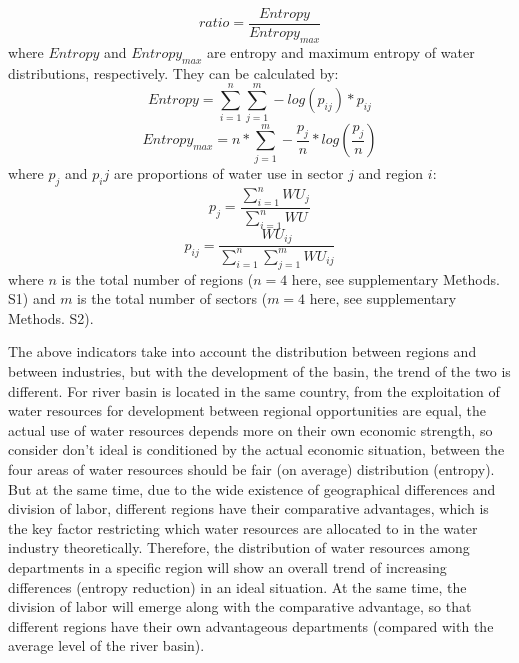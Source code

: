 \documentclass[9pt,twoside,lineno]{pnas-new}
\begin{document}
    $$ ratio = \frac{Entropy}{Entropy_{max}} $$
	where $Entropy$ and $Entropy_{max}$ are entropy and maximum entropy of water distributions, respectively. They can be calculated by:
	$$ Entropy = \sum_{i=1}^n \sum_{j=1}^m -log(p_{ij}) * p_{ij} $$
	$$ Entropy_{max} = n * \sum_{j=1}^m -\frac{p_j}{n} * log(\frac{p_j}{n}) $$ 
    where $p_j$ and $p_ij$ are proportions of water use in sector $j$ and region $i$:
	$$ p_j = \frac{\sum_{i=1}^n WU_j}{\sum_{i=1}^n WU} $$
	$$ p_{ij} = \frac{WU_{ij}} {\sum_{i=1}^n \sum_{j=1}^m WU_{ij}} $$
	where $n$ is the total number of regions ($n=4$ here, see supplementary Methods. S1) and $m$ is the total number of sectors ($m=4$ here, see supplementary Methods. S2).

    The above indicators take into account the distribution between regions and between industries, but with the development of the basin, the trend of the two is different. For river basin is located in the same country, from the exploitation of water resources for development between regional opportunities are equal, the actual use of water resources depends more on their own economic strength, so consider don't ideal is conditioned by the actual economic situation, between the four areas of water resources should be fair (on average) distribution (entropy). But at the same time, due to the wide existence of geographical differences and division of labor, different regions have their comparative advantages, which is the key factor restricting which water resources are allocated to in the water industry theoretically. Therefore, the distribution of water resources among departments in a specific region will show an overall trend of increasing differences (entropy reduction) in an ideal situation. At the same time, the division of labor will emerge along with the comparative advantage, so that different regions have their own advantageous departments (compared with the average level of the river basin).
\end{document}
